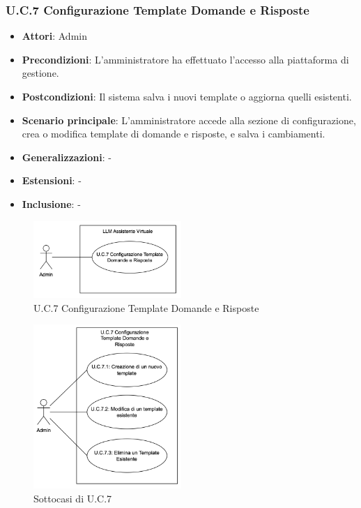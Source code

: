 \subsubsection{U.C.7 Configurazione Template Domande e Risposte}
\begin{itemize}
    \item \textbf{Attori}: Admin
    \item \textbf{Precondizioni}: L’amministratore ha effettuato l’accesso alla piattaforma di gestione.
    \item \textbf{Postcondizioni}: Il sistema salva i nuovi template o aggiorna quelli esistenti.
    \item \textbf{Scenario principale}: L’amministratore accede alla sezione di configurazione, crea o modifica template di domande e risposte, e salva i cambiamenti.
    \item \textbf{Generalizzazioni}: -
    \item \textbf{Estensioni}: -
    \item \textbf{Inclusione}: -
\end{itemize}
\begin{figure}[H]
    \centering
    \includegraphics[width=0.5\textwidth]{img/UC7.png}
    \caption{U.C.7 Configurazione Template Domande e Risposte}
\end{figure}
\begin{figure}[H]
    \centering
    \includegraphics[width=0.5\textwidth]{img/UC7p1.png}
    \caption{Sottocasi di U.C.7}
\end{figure}
\newpage
